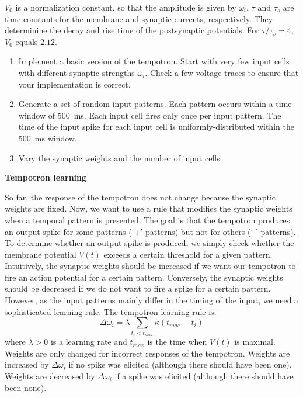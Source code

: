 \documentclass[12pt]{article}
\begin{document}
$V_0$ is a normalization constant, so that the amplitude is given by
$\omega_i$. $\tau$ and $\tau_s$ are time constants for the membrane
and synaptic currents, respectively. They determinine the decay and
rise time of the postsynaptic potentials. For $\tau/\tau_s = 4$, $V_0$
equals $2.12$.

\begin{enumerate}
   \item Implement a basic version of the tempotron. Start with very
   few input cells with different synaptic strengths $\omega_i$. Check
   a few voltage traces to ensure that your implementation is correct.
   \item Generate a set of random input patterns. Each pattern occurs
   within a time window of 500~ms. Each input cell fires only once
   per input pattern. The time of the input spike for each input cell
   is uniformly-distributed within the 500~ms window.
   \item Vary the synaptic weights and the number of input cells.
\end{enumerate}    

{\bf Tempotron learning} 

So far, the response of the tempotron does not change because the
synaptic weights are fixed. Now, we want to use a rule that modifies
the synaptic weights when a temporal pattern is presented. The goal is
that the tempotron produces an output spike for some patterns (`+'
patterns) but not for others (`-' patterns). To determine whether an
output spike is produced, we simply check whether the membrane
potential $V(t)$ exceeds a certain threshold for a given pattern.
Intuitively, the synaptic weights should be increased if we want our
tempotron to fire an action potential for a certain pattern.
Conversely, the synaptic weights should be decreased if we do not want
to fire a spike for a certain pattern. However, as the input patterns
mainly differ in the timing of the input, we need a sophisticated
learning rule. The tempotron learning rule is:
  $$ \Delta\omega_i = \lambda \sum_{t_i<t_{max}} \kappa
  (t_{max}-t_i)$$ where $\lambda>0$ is a learning rate and $t_{max}$
  is the time when $V(t)$ is maximal. Weights are only changed for
  incorrect responses of the tempotron. Weights are increased by
  $\Delta\omega_i$ if no spike was elicited (although there should have
  been one). Weights are decreased by $\Delta\omega_i$ if a spike was
  elicited (although there should have been none).
\end{document}
